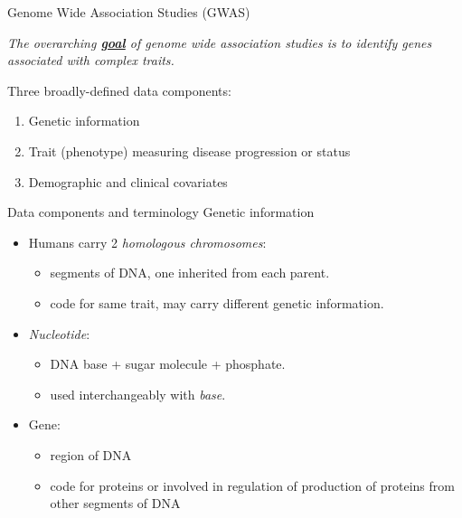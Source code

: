 \begin{frame}{Genome Wide Association Studies (GWAS)}

\emph{The overarching \underline{\bf goal} of genome wide association studies is to identify genes associated with complex traits.}

\bigskip
Three broadly-defined data components:
\begin{enumerate}
\item Genetic information
\item Trait (phenotype) measuring disease progression or status
\item Demographic and clinical covariates 
\end{enumerate}
\begin{figure}[ht]
\end{figure}
\end{frame}

\begin{frame}{Data components and terminology}
Genetic information
\begin{itemize}
\item Humans carry 2 \emph{homologous chromosomes}:
	\begin{itemize}
	\item segments of DNA, one inherited from each parent.
	\item code for same trait, may carry different genetic information.
	\end{itemize}
\item \emph{Nucleotide}:
	\begin{itemize}
	\item DNA base + sugar molecule + phosphate.
	\item used interchangeably with \emph{base}.
	\end{itemize}
\item Gene:
	\begin{itemize}
	\item region of DNA
	\item code for proteins or involved in regulation of production of proteins from other segments of DNA
	\end{itemize}
\end{itemize}
\end{frame}
	
